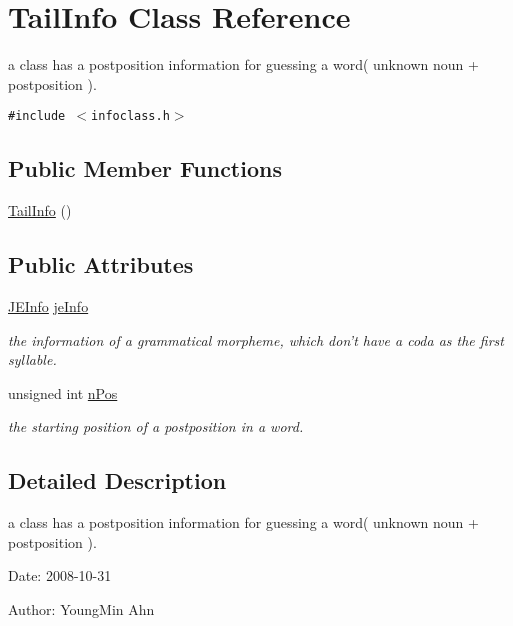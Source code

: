 \hypertarget{classTailInfo}{
\section{TailInfo Class Reference}
\label{classTailInfo}
}
a class has a postposition information for guessing a word( unknown noun + postposition ).  


{\tt \#include $<$infoclass.h$>$}

\subsection*{Public Member Functions}
\begin{CompactItemize}
\item 
\hyperlink{classTailInfo_09ea7a2c1c615f56597e0215ef8a89fa}{TailInfo} ()
\end{CompactItemize}
\subsection*{Public Attributes}
\begin{CompactItemize}
\item 
\hyperlink{classJEInfo}{JEInfo} \hyperlink{classTailInfo_5d3b2a9c5d301d40eb34f114db04c049}{jeInfo}
\begin{CompactList}\small\item\em the information of a grammatical morpheme, which don't have a coda as the first syllable. \item\end{CompactList}\item 
unsigned int \hyperlink{classTailInfo_d8fac4baca85f9538f5d6e0e97d0e78d}{nPos}
\begin{CompactList}\small\item\em the starting position of a postposition in a word. \item\end{CompactList}\end{CompactItemize}


\subsection{Detailed Description}
a class has a postposition information for guessing a word( unknown noun + postposition ). 

\begin{Desc}
\item[Date:]2008-10-31 \end{Desc}
\begin{Desc}
\item[Author:]YoungMin Ahn \end{Desc}



